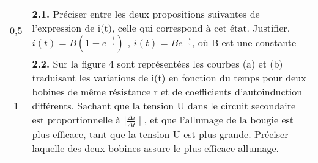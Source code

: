 \documentclass[12pt]{article}
\begin{document}
\hspace{-0.8cm}
\begin{tabular}{c|l}	

	0,5 & \makecell[l]{\textbf{2.1. }Préciser entre les deux propositions suivantes de l’expression de i(t), celle qui correspond à \\cet état. Justifier. $i(t) = B(1-e^{-\frac{t}{\tau}})$  , $i(t) = Be^{-\frac{t}{\tau}}$, où B est une constante}\\
		1 & \makecell[l]{\textbf{2.2. }Sur la figure 4 sont
représentées les courbes (a)
et (b) traduisant les
variations de i(t) en fonction
\\du temps pour deux
bobines de même résistance r et de coefficients d’autoinduction différents.\\
Sachant que la tension U dans le circuit secondaire est proportionnelle à $\mid \frac{\Delta{i}}{\Delta{t}} \mid$, et que
l’allumage\\ de la bougie est plus efficace, tant que la tension U est plus grande.
Préciser laquelle des deux \\bobines assure le plus efficace allumage.
}\\

\end{tabular}



\end{document}
